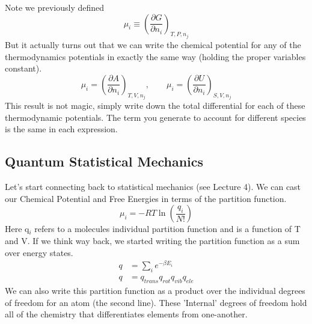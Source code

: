 \documentclass{article}
\begin{document}
Note we previously defined 
\begin{equation}
    \mu_i \equiv \left(\frac{\partial G}{\partial n_i}\right)_{T,P,n_j}
\end{equation}
But it actually turns out that we can write the chemical potential for any of the thermodynamics potentials in exactly the same way (holding the proper variables constant). 
\begin{equation}
     \mu_i = \left(\frac{\partial A}{\partial n_i}\right)_{T,V,n_j}, \qquad  \mu_i = \left(\frac{\partial U}{\partial n_i}\right)_{S,V,n_j}
\end{equation}
This result is not magic, simply write down the total differential for each of these thermodynamic potentials. 
The term you generate to account for different species is the same in each expression. 

\subsection*{Quantum Statistical Mechanics}
Let's start connecting back to statistical mechanics (see Lecture 4). 
We can cast our Chemical Potential and Free Energies in terms of the partition function. 
\begin{equation}
     \mu_i = -RT \ln\left(\frac{q_i}{N!}\right)
\end{equation}
Here q$_i$ refers to a molecules individual partition function and is a function of T and V. 
If we think way back, we started writing the partition function as a sum over energy states. 
\begin{equation}
\begin{split}
     q &= \sum_i e^{-\beta E_i}\\
     q &= q_{trans}q_{rot}q_{vib}q_{ele}
     \end{split}
\end{equation}
We can also write this partition function as a product over the individual degrees of freedom for an atom (the second line).
These 'Internal' degrees of freedom hold all of the chemistry that differentiates elements from one-another. 
\end{document}
